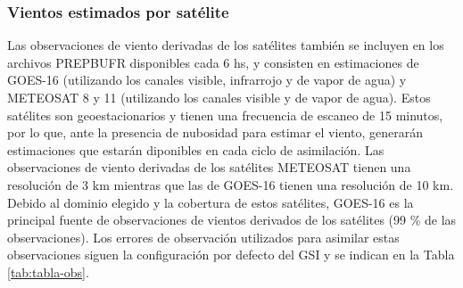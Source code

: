\documentclass[12pt,oneside]{reedthesis}
\begin{document}
\hypertarget{vientos-estimados-por-satuxe9lite}{%
\subsubsection{Vientos estimados por satélite}\label{vientos-estimados-por-satuxe9lite}}

Las observaciones de viento derivadas de los satélites también se incluyen en los archivos PREPBUFR disponibles cada 6 hs, y consisten en estimaciones de GOES-16 (utilizando los canales visible, infrarrojo y de vapor de agua) y METEOSAT 8 y 11 (utilizando los canales visible y de vapor de agua). Estos satélites son geoestacionarios y tienen una frecuencia de escaneo de 15 minutos, por lo que, ante la presencia de nubosidad para estimar el viento, generarán estimaciones que estarán diponibles en cada ciclo de asimilación. Las observaciones de viento derivadas de los satélites METEOSAT tienen una resolución de 3 km mientras que las de GOES-16 tienen una resolución de 10 km. Debido al dominio elegido y la cobertura de estos satélites, GOES-16 es la principal fuente de observaciones de vientos derivados de los satélites (99 \% de las observaciones). Los errores de observación utilizados para asimilar estas observaciones siguen la configuración por defecto del GSI y se indican en la Tabla \ref{tab:tabla-obs}.
\end{document}
